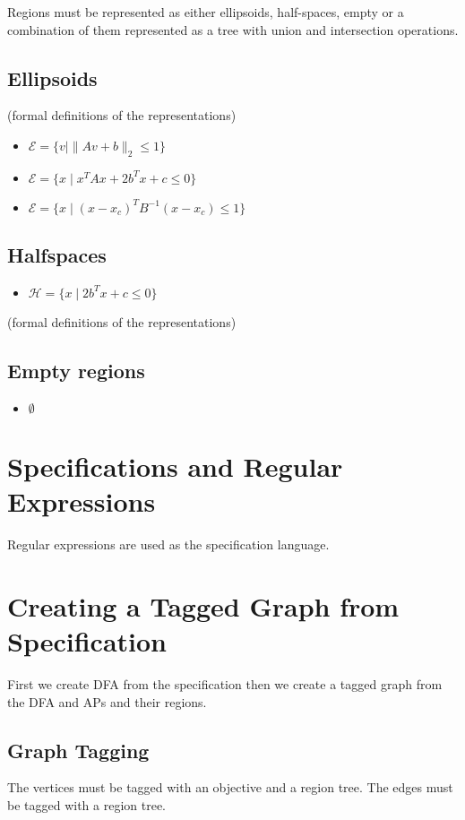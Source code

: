 \documentclass[letterpaper, 10pt, conference]{ieeeconf}   %
\begin{document}
Regions must be represented as either ellipsoids, half-spaces, empty or a
combination of them represented as a tree with union and intersection
operations.

\subsection{Ellipsoids}
(formal definitions of the representations)
\begin{itemize}
	\item $\mathcal{E} = \{ v \mid \|A v + b\|_2 \leq 1  \}$
	\item $\mathcal{E} = \{ x \mid x^T A x + 2 b^Tx + c \leq 0 \}$
	\item $\mathcal{E} = \{ x \mid (x - x_c)^T B^{-1} (x - x_c) \leq 1 \}$
\end{itemize}

\subsection{Halfspaces}
\begin{itemize}
	\item $\mathcal{H} = \{ x \mid 2b^Tx + c \leq 0 \}$
\end{itemize}
(formal definitions of the representations)

\subsection{Empty regions}
\begin{itemize}
	\item $\emptyset$
\end{itemize}

\section{Specifications and Regular Expressions}

Regular expressions are used as the specification language.

\section{Creating a Tagged Graph from Specification}

First we create DFA from the specification then we create a tagged graph from
the DFA and APs and their regions.

\subsection{Graph Tagging}
The vertices must be tagged with an objective and a region tree. The edges must
be tagged with a region tree.
 
\end{document}
